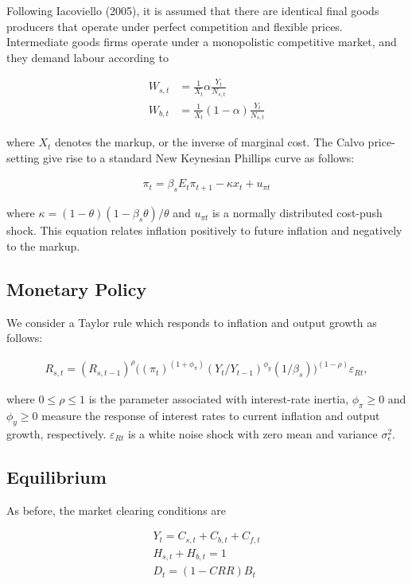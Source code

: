 \documentclass[final,3p,times,twocolumn]{elsarticle}
\begin{document}
Following Iacoviello (2005), it is assumed that there are identical final goods producers that operate under perfect competition and flexible prices. Intermediate goods firms operate under a monopolistic competitive market, and they demand labour according to

\begin{align}
W_{s,t} &= \frac{1}{X_t}\alpha\frac{Y_t}{N_{s,t}} \\
W_{b,t} &= \frac{1}{X_t}(1-\alpha)\frac{Y_t}{N_{s,t}}
\end{align}

where $X_t$ denotes the markup, or the inverse of marginal cost. The Calvo price-setting give rise to a standard New Keynesian Phillips curve as follows:

\begin{align}
    \pi_t = \beta_s E_t \pi_{t+1} - \kappa x_t + u_{\pi t}
\end{align}

where $\kappa = (1-\theta)(1-\beta_s \theta)/\theta$ and $u_{\pi t}$ is a normally distributed cost-push shock. This equation relates inflation positively to future inflation and negatively to the markup.

 \subsection{Monetary Policy}
 
 We consider a Taylor rule which responds to inflation and output growth as follows:
 
 \begin{align}
R_{s,t} = (R_{s,t-1})^\rho \bigg((\pi_t)^{(1+\phi_\pi)} (Y_t/Y_{t-1})^{\phi_y} (1/\beta_s)\bigg)^{(1-\rho)} \varepsilon_{Rt},
\end{align}

where $0\leq \rho \leq 1$ is the parameter associated with interest-rate inertia, $\phi_\pi\ge 0$ and $\phi_y \ge 0$ measure the response of interest rates to current inflation and output growth, respectively. $\varepsilon_{Rt}$ is a white noise shock with zero mean and variance $\sigma_\epsilon^2$.

 \subsection{Equilibrium}

As before, the market clearing conditions are

\begin{align}
Y_t = C_{s,t} + C_{b,t} + C_{f,t} \\
H_{s,t} + H_{b,t} = 1 \\
D_t = (1-CRR)B_t 
\end{align}
\end{document}
